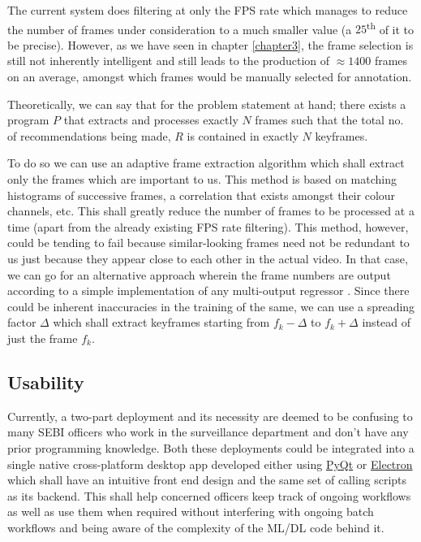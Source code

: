 The current system does filtering at only the FPS rate which manages to reduce the number of frames under consideration to a much smaller value (a $25$\textsuperscript{th} of it to be precise). However, as we have seen in chapter \ref{chapter3}, the frame selection is still not inherently intelligent and still leads to the production of  $ \approx 1400$ frames on an average, amongst which frames would be manually selected for annotation. \par

Theoretically, we can say that for the problem statement at hand; there exists a program $P$ that extracts and processes exactly $N$ frames such that the total no. of recommendations being made, $R$ is contained in exactly $N$ keyframes. \par

To do so we can use an adaptive frame extraction algorithm \cite{adapt} which shall extract only the frames which are important to us. This method is based on matching histograms of successive frames, a correlation that exists amongst their colour channels, etc. This shall greatly reduce the number of frames to be processed at a time (apart from the already existing FPS rate filtering). This method, however, could be tending to fail because similar-looking frames need not be redundant to us just because they appear close to each other in the actual video. In that case, we can go for an alternative approach wherein the frame numbers are output according to a simple implementation of any multi-output regressor \cite{Brownlee2020}. Since there could be inherent inaccuracies in the training of the same, we can use a spreading factor $\Delta$ which shall extract keyframes starting from ${f}_{k} - \Delta$ to ${f}_{k} + \Delta$ instead of just the frame $f_k$.

\subsection{Usability}

Currently, a two-part deployment and its necessity are deemed to be confusing to many SEBI officers who work in the surveillance department and don’t have any prior programming knowledge. Both these deployments could be integrated into a single native cross-platform desktop app developed either using \href{https://riverbankcomputing.com/software/pyqt/intro}{PyQt} or \href{electronjs.org}{Electron} which shall have an intuitive front end design and the same set of calling scripts as its backend. This shall help concerned officers keep track of ongoing workflows as well as use them when required without interfering with ongoing batch workflows and being aware of the complexity of the ML/DL code behind it.

